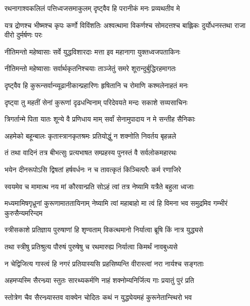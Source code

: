 \twolineshloka
{रथनागाश्वकलिलं पत्तिध्वजसमाकुलम्}
{दृष्ट्वैव हि परानीकं मनः प्रव्यथतीव मे}


\threelineshloka
{यत्र द्रोणश्च भीष्मश्च कृपः कर्णो विविंशतिः}
{अश्वत्थामा विकर्णश्च सोमदत्तश्च बाह्लिकः}
{दुर्योधनस्तथा राजा वीरो दुर्मर्षणः परः}


\twolineshloka
{नीतिमन्तो महेष्वासाः सर्वे युद्धविशारदाः}
{मत्ता इव महानागा युक्तध्वजपताकिनः}


\twolineshloka
{नीतिमन्तो महेष्वासाः सर्वार्थकृतनिश्चयाः}
{ताञ्जेतुं समरे शूरान्दुर्बुद्धिरहमागतः}


\twolineshloka
{दृष्ट्वैव हि कुरून्सर्वान्व्यूढानीकान्प्रहारिणः}
{हृषितानि च रोमाणि कश्मलेनाहतं मनः}



\twolineshloka
{दृष्ट्वा तु महतीं सेनां कुरूणां दृढधन्विनाम्}
{परिदेवयते मन्दः सकाशे सव्यसाचिनः}


\twolineshloka
{त्रिगर्तान्मे पिता यातः शून्ये वै प्रणिधाय माम्}
{सर्वां सेनामुपादाय न मे सन्तीह सैनिकाः}


\twolineshloka
{अहमेको बहून्बालः कृतास्त्रानकृतश्रमः}
{प्रतियोद्धुं न शक्नोति निवर्तय बृहन्नले}



\twolineshloka
{तं तथा वादिनं तत्र बीभत्सुः प्रत्यभाषत}
{सम्प्रहस्य पुनस्तं वै सर्वलोकमहारथः}


\twolineshloka
{भयेन दीनरूपोऽसि द्विषतां हर्षवर्धनः}
{न च तावत्कृतं किञ्चित्परैः कर्म रणाजिरे}


\twolineshloka
{स्वयमेव च मामात्थ नय मां कौरवान्प्रति}
{सोऽहं त्वां तत्र नेष्यामि यत्रैते बहुला ध्वजाः}


\threelineshloka
{मध्यमामिषगृध्रूनां कुरूणामाततायिनाम्}
{नेष्यामि त्वां महाबाहो मा त्वं हि विमना भव}
{समुद्रमिव गम्भीरं कुरुसैन्यमरिन्दम}


\twolineshloka
{स्त्रीसकाशे प्रतिज्ञाय पुरुषाणां हि शृण्वताम्}
{विकत्थमानो निर्यात्वा ब्रूषि किं नात्र युद्ध्यसे}


\twolineshloka
{तथा स्त्रीषु प्रतिश्रुत्य पौरुषं पुरुषेषु च}
{रथमारुह्य निर्यात्वा किमर्थं नावबुध्यसे}


\twolineshloka
{न चेद्विजित्य गास्त्वं हि नगरं प्रतियास्यसि}
{प्रहसिष्यन्ति वीरास्त्वां नरा नार्यश्च सङ्गताः}


\twolineshloka
{अहमप्यस्मि सैरन्ध्र्या स्तुतः सारथ्यकर्मणि}
{नाहं शक्नोम्यनिर्जित्य गाः प्रयातुं पुरं प्रति}


\twolineshloka
{स्तोत्रेण चैव सैरन्ध्र्यास्तव वाक्येन चोदितः}
{कथं न युद्ध्येयमहं कुरूनेतान्स्थिरो भव}

